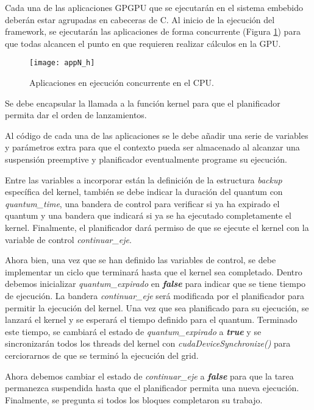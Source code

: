 Cada una de las aplicaciones GPGPU que se ejecutarán en el sistema embebido deberán estar agrupadas en cabeceras de C. Al inicio de la ejecución del framework, se ejecutarán las aplicaciones de forma concurrente (Figura \ref{fig:appN_h}) para que todas alcancen el punto en que requieren realizar cálculos en la GPU.
\newline 

  \begin{figure}[!]
      \centering
        \texttt{[image: appN\_h]}
        \caption{Aplicaciones en ejecución concurrente en el CPU.}
        \label{fig:appN_h}
    \end{figure}

Se debe encapsular la llamada a la función kernel para que el planificador permita dar el orden de lanzamientos.

Al código de cada una de las aplicaciones se le debe añadir una serie de variables y parámetros extra para que el contexto pueda ser almacenado al alcanzar una suspensión preemptive y planificador eventualmente programe su ejecución. 

Entre las variables a incorporar están la definición de la estructura \textit{backup} específica del kernel, también se debe indicar la duración del quantum con \textit{quantum\_time}, una bandera de control para verificar si ya ha expirado el quantum y una bandera que indicará si ya se ha ejecutado completamente el kernel. Finalmente, el planificador dará permiso de que se ejecute el kernel con la variable de control \textit{continuar\_eje}.
\newline

Ahora bien, una vez que se han definido las variables de control, se debe implementar un ciclo que terminará hasta que el kernel sea completado. Dentro debemos inicializar \textit{quantum\_expirado} en \textbf{\textit{false}} para indicar que se tiene tiempo de ejecución. La bandera \textit{continuar\_eje} será modificada por el planificador para permitir la ejecución del kernel. Una vez que sea planificado para su ejecución, se lanzará el kernel  y se esperará el tiempo definido para el quantum. Terminado este tiempo, se cambiará el estado de \textit{quantum\_expirado} a \textit{\textbf{true}} y se sincronizarán todos los threads del kernel con \textit{cudaDeviceSynchronize()} para cerciorarnos de que se terminó la ejecución del grid.

Ahora debemos cambiar el estado de \textit{continuar\_eje} a \textbf{\textit{false}} para que la tarea permanezca suspendida hasta que el planificador permita una nueva ejecución. Finalmente, se pregunta si todos los bloques completaron su trabajo.

